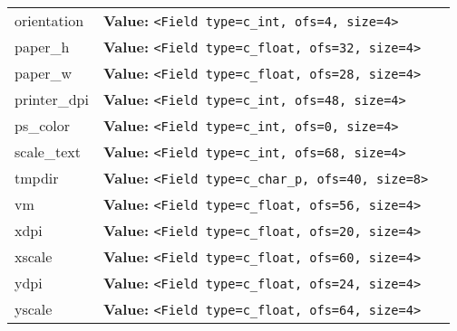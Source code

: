\begin{longtable}{|p{\varnamewidth}|p{\vardescrwidth}|l}
\cline{1-2}
\raggedright o\-r\-i\-e\-n\-t\-a\-t\-i\-o\-n\- & \raggedright \textbf{Value:} 
{\tt {\textless}Field type=c\_int, ofs=4, size=4{\textgreater}}&\\
\cline{1-2}
\raggedright p\-a\-p\-e\-r\-\_\-h\- & \raggedright \textbf{Value:} 
{\tt {\textless}Field type=c\_float, ofs=32, size=4{\textgreater}}&\\
\cline{1-2}
\raggedright p\-a\-p\-e\-r\-\_\-w\- & \raggedright \textbf{Value:} 
{\tt {\textless}Field type=c\_float, ofs=28, size=4{\textgreater}}&\\
\cline{1-2}
\raggedright p\-r\-i\-n\-t\-e\-r\-\_\-d\-p\-i\- & \raggedright \textbf{Value:} 
{\tt {\textless}Field type=c\_int, ofs=48, size=4{\textgreater}}&\\
\cline{1-2}
\raggedright p\-s\-\_\-c\-o\-l\-o\-r\- & \raggedright \textbf{Value:} 
{\tt {\textless}Field type=c\_int, ofs=0, size=4{\textgreater}}&\\
\cline{1-2}
\raggedright s\-c\-a\-l\-e\-\_\-t\-e\-x\-t\- & \raggedright \textbf{Value:} 
{\tt {\textless}Field type=c\_int, ofs=68, size=4{\textgreater}}&\\
\cline{1-2}
\raggedright t\-m\-p\-d\-i\-r\- & \raggedright \textbf{Value:} 
{\tt {\textless}Field type=c\_char\_p, ofs=40, size=8{\textgreater}}&\\
\cline{1-2}
\raggedright v\-m\- & \raggedright \textbf{Value:} 
{\tt {\textless}Field type=c\_float, ofs=56, size=4{\textgreater}}&\\
\cline{1-2}
\raggedright x\-d\-p\-i\- & \raggedright \textbf{Value:} 
{\tt {\textless}Field type=c\_float, ofs=20, size=4{\textgreater}}&\\
\cline{1-2}
\raggedright x\-s\-c\-a\-l\-e\- & \raggedright \textbf{Value:} 
{\tt {\textless}Field type=c\_float, ofs=60, size=4{\textgreater}}&\\
\cline{1-2}
\raggedright y\-d\-p\-i\- & \raggedright \textbf{Value:} 
{\tt {\textless}Field type=c\_float, ofs=24, size=4{\textgreater}}&\\
\cline{1-2}
\raggedright y\-s\-c\-a\-l\-e\- & \raggedright \textbf{Value:} 
{\tt {\textless}Field type=c\_float, ofs=64, size=4{\textgreater}}&\\
\cline{1-2}
\end{longtable}



